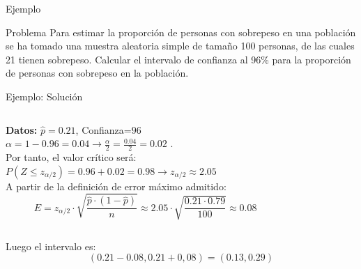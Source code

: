 \documentclass[11pt,handout]{beamer}
\begin{document}
\begin{frame}
{Ejemplo}
\begin{block}{Problema} Para estimar la proporción de personas con sobrepeso en una población se ha tomado una
muestra aleatoria simple de tamaño 100 personas, de las cuales 21 tienen sobrepeso. Calcular el intervalo
de confianza al 96\% para la proporción de personas con sobrepeso en la población.
\end{block}
\end{frame}

\begin{frame}{Ejemplo: Solución}
\begin{columns}
\begin{column}{0.55\textwidth}
    \textbf{Datos:} $\widehat{p}=0.21$, Confianza=$96$ \\
$\alpha=1-0.96=0.04 \to \frac{\alpha}{2}=\frac{0.04}{2}=0.02$
. \\ Por tanto, el valor crítico será: \\

$P\left(Z \leqslant z_{\alpha / 2} \right)= 0.96 + 0.02 = 0.98 \to z_{\alpha / 2} \approx 2.05$ \\ 
A partir de la definición de error máximo admitido:
$$E=z_{\alpha / 2}\cdot \sqrt{\frac{\widehat{p}\cdot\left(1-\widehat{p} \right)}{n}}\approx 2.05 \cdot \sqrt{\frac{0.21\cdot 0.79}{100}}\approx 0.08$$

\end{column}
\begin{column}{0.45\textwidth}

\end{column}
\end{columns}
Luego el intervalo es: $$\left( 0.21 - 0.08 , 0.21 + 0,08 \right) = \left(0.13, 0.29 \right)$$ 
\end{frame}
\end{document}

